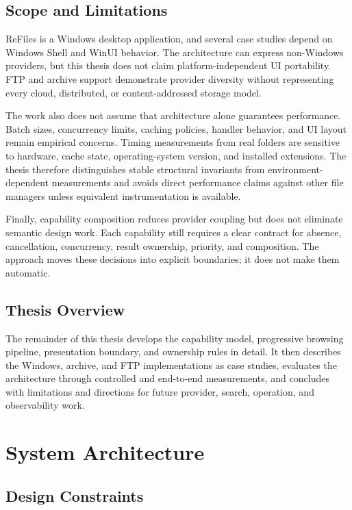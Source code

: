 \documentclass[10pt,a4paper,twoside]{article}
\begin{document}
\subsection{Scope and Limitations}

ReFiles is a Windows desktop application, and several case studies depend on Windows Shell and WinUI behavior.
The architecture can express non-Windows providers, but this thesis does not claim platform-independent UI
portability. FTP and archive support demonstrate provider diversity without representing every cloud,
distributed, or content-addressed storage model.

The work also does not assume that architecture alone guarantees performance. Batch sizes, concurrency limits,
caching policies, handler behavior, and UI layout remain empirical concerns. Timing measurements from real
folders are sensitive to hardware, cache state, operating-system version, and installed extensions. The thesis
therefore distinguishes stable structural invariants from environment-dependent measurements and avoids direct
performance claims against other file managers unless equivalent instrumentation is available.

Finally, capability composition reduces provider coupling but does not eliminate semantic design work. Each
capability still requires a clear contract for absence, cancellation, concurrency, result ownership, priority,
and composition. The approach moves these decisions into explicit boundaries; it does not make them automatic.

\subsection{Thesis Overview}

The remainder of this thesis develops the capability model, progressive browsing pipeline, presentation boundary,
and ownership rules in detail. It then describes the Windows, archive, and FTP implementations as case studies,
evaluates the architecture through controlled and end-to-end measurements, and concludes with limitations and
directions for future provider, search, operation, and observability work.

\section{System Architecture}
\label{section:architecture}

\subsection{Design Constraints}
\end{document}
